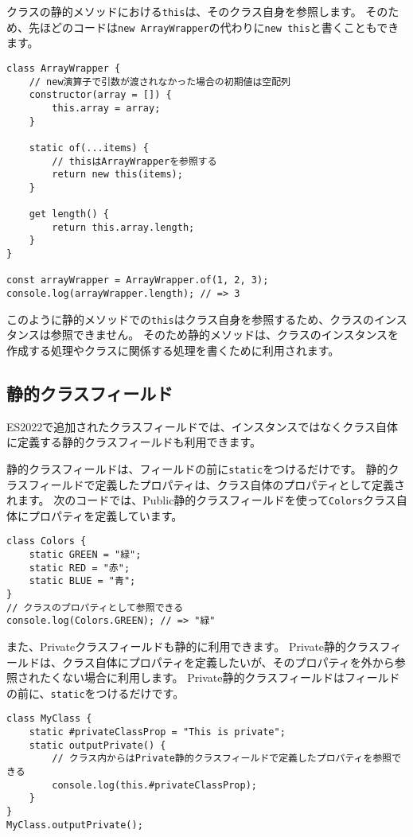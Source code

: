 クラスの静的メソッドにおける\texttt{this}は、そのクラス自身を参照します。
そのため、先ほどのコードは\texttt{new ArrayWrapper}の代わりに\texttt{new this}と書くこともできます。

\begin{lstlisting}
class ArrayWrapper {
    // new演算子で引数が渡されなかった場合の初期値は空配列
    constructor(array = []) {
        this.array = array;
    }

    static of(...items) {
        // thisはArrayWrapperを参照する
        return new this(items);
    }

    get length() {
        return this.array.length;
    }
}

const arrayWrapper = ArrayWrapper.of(1, 2, 3);
console.log(arrayWrapper.length); // => 3
\end{lstlisting}

このように静的メソッドでの\texttt{this}はクラス自身を参照するため、クラスのインスタンスは参照できません。
そのため静的メソッドは、クラスのインスタンスを作成する処理やクラスに関係する処理を書くために利用されます。

\hypertarget{static-class-fields}{%
\subsection[静的クラスフィールド]{静的クラスフィールド\,\protect{}}\label{static-class-fields}}

ES2022で追加されたクラスフィールドでは、インスタンスではなくクラス自体に定義する静的クラスフィールドも利用できます。

静的クラスフィールドは、フィールドの前に\texttt{static}をつけるだけです。
静的クラスフィールドで定義したプロパティは、クラス自体のプロパティとして定義されます。
次のコードでは、Public静的クラスフィールドを使って\texttt{Colors}クラス自体にプロパティを定義しています。

\begin{lstlisting}
class Colors {
    static GREEN = "緑";
    static RED = "赤";
    static BLUE = "青";
}
// クラスのプロパティとして参照できる
console.log(Colors.GREEN); // => "緑"
\end{lstlisting}

また、Privateクラスフィールドも静的に利用できます。
Private静的クラスフィールドは、クラス自体にプロパティを定義したいが、そのプロパティを外から参照されたくない場合に利用します。
Private静的クラスフィールドはフィールドの前に、\texttt{static}をつけるだけです。
\newpage
\begin{lstlisting}
class MyClass {
    static #privateClassProp = "This is private";
    static outputPrivate() {
        // クラス内からはPrivate静的クラスフィールドで定義したプロパティを参照できる
        console.log(this.#privateClassProp);
    }
}
MyClass.outputPrivate();
\end{lstlisting}

